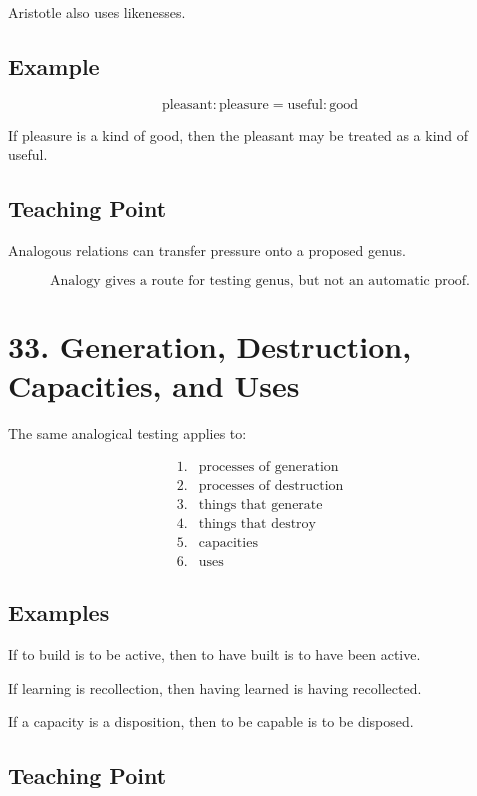 \documentclass[12pt]{article}
\begin{document}
Aristotle also uses likenesses.

\subsection*{Example}

\[
\text{pleasant}:\text{pleasure}
=
\text{useful}:\text{good}
\]

If pleasure is a kind of good, then the pleasant may be treated as a kind of
useful.

\subsection*{Teaching Point}

Analogous relations can transfer pressure onto a proposed genus.

\[
\boxed{
\text{Analogy gives a route for testing genus, but not an automatic proof.}
}
\]

\section*{33. Generation, Destruction, Capacities, and Uses}

The same analogical testing applies to:

\[
\begin{array}{ll}
1. & \text{processes of generation} \\
2. & \text{processes of destruction} \\
3. & \text{things that generate} \\
4. & \text{things that destroy} \\
5. & \text{capacities} \\
6. & \text{uses}
\end{array}
\]

\subsection*{Examples}

If to build is to be active, then to have built is to have been active.

If learning is recollection, then having learned is having recollected.

If a capacity is a disposition, then to be capable is to be disposed.

\subsection*{Teaching Point}
\end{document}
